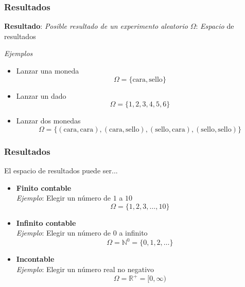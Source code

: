 \documentclass[xcolor=dvipsnames,10pt]{beamer}
\begin{document}
\begin{frame}
  \frametitle{Resultados}
  \begin{tcolorbox}
    \textbf{Resultado}: \emph{Posible resultado de un experimento aleatorio}
    \tcblower
    $\Omega$: \emph{Espacio} de resultados
  \end{tcolorbox}
  \emph{Ejemplos}
  \begin{itemize}
  \item Lanzar una moneda\\
    \begin{equation*}
      \Omega = \{\text{cara}, \text{sello} \}
    \end{equation*}
  \item Lanzar un dado\\
    \begin{equation*}
      \Omega = \{1, 2, 3, 4, 5, 6 \}
    \end{equation*}
  \item Lanzar dos monedas\\
    \begin{equation*}
      \Omega = \{(\text{cara}, \text{cara}), (\text{cara}, \text{sello}), (\text{sello}, \text{cara}), (\text{sello}, \text{sello}) \}
    \end{equation*}
  \end{itemize}
\end{frame}
%
\begin{frame}
  \frametitle{Resultados}
  El espacio de resultados puede ser...
  \begin{itemize}
  \item \textbf{Finito contable}\\
    \emph{Ejemplo}: Elegir un número de $1$ a $10$
    \begin{equation*}
      \Omega = \{1, 2, 3, \dots, 10 \}
    \end{equation*}
  \item \textbf{Infinito contable}\\
    \emph{Ejemplo}: Elegir un número de $0$ a infinito
    \begin{equation*}
      \Omega = \mathbb{N}^0 = \{ 0, 1, 2, \dots\}
    \end{equation*}
  \item \textbf{Incontable}\\
    \emph{Ejemplo}: Elegir un número real no negativo
    \begin{equation*}
      \Omega = \mathbb{R}^+ = [0, \infty)
    \end{equation*}
  \end{itemize}
\end{frame}
\end{document}
